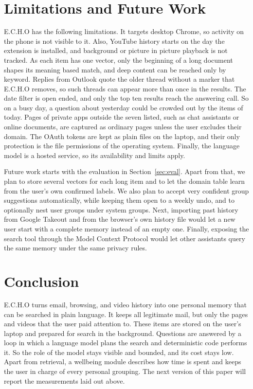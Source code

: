 \documentclass[conference]{IEEEtran}
\begin{document}
\section{Limitations and Future Work}\label{sec:limits}
E.C.H.O has the following limitations. It targets desktop Chrome, so activity on the phone is not visible to it. Also, YouTube history starts on the day the extension is installed, and background or picture in picture playback is not tracked. As each item has one vector, only the beginning of a long document shapes its meaning based match, and deep content can be reached only by keyword. Replies from Outlook quote the older thread without a marker that E.C.H.O removes, so such threads can appear more than once in the results. The date filter is open ended, and only the top ten results reach the answering call. So on a busy day, a question about yesterday could be crowded out by the items of today. Pages of private apps outside the seven listed, such as chat assistants or online documents, are captured as ordinary pages unless the user excludes their domain. The OAuth tokens are kept as plain files on the laptop, and their only protection is the file permissions of the operating system. Finally, the language model is a hosted service, so its availability and limits apply.

Future work starts with the evaluation in Section~\ref{sec:eval}. Apart from that, we plan to store several vectors for each long item and to let the domain table learn from the user's own confirmed labels. We also plan to accept very confident group suggestions automatically, while keeping them open to a weekly undo, and to optionally nest user groups under system groups. Next, importing past history from Google Takeout and from the browser's own history file would let a new user start with a complete memory instead of an empty one. Finally, exposing the search tool through the Model Context Protocol would let other assistants query the same memory under the same privacy rules.

\section{Conclusion}\label{sec:conc}
E.C.H.O turns email, browsing, and video history into one personal memory that can be searched in plain language. It keeps all legitimate mail, but only the pages and videos that the user paid attention to. These items are stored on the user's laptop and prepared for search in the background. Questions are answered by a loop in which a language model plans the search and deterministic code performs it. So the role of the model stays visible and bounded, and its cost stays low. Apart from retrieval, a wellbeing module describes how time is spent and keeps the user in charge of every personal grouping. The next version of this paper will report the measurements laid out above.
\end{document}
